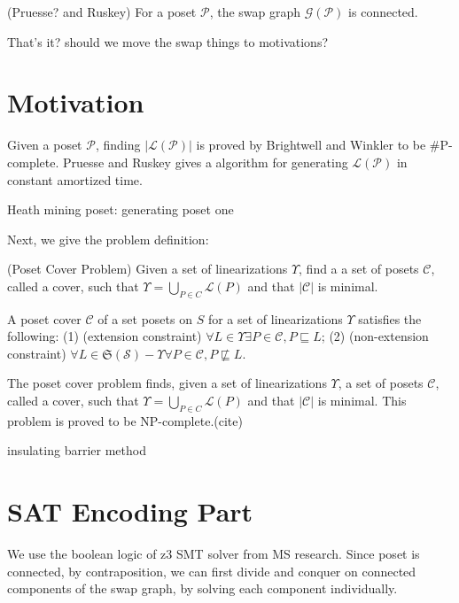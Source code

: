 \documentclass{llncs}
\begin{document}
\begin{theorem}
    (Pruesse? and Ruskey) For a poset $\mathcal{P}$, the swap graph $\mathcal{G}(\mathcal{P})$ is connected.
\end{theorem}

That's it? should we move the swap things to motivations?

\section{Motivation}

Given a poset $\mathcal{P}$, finding $|\mathcal{L}(\mathcal{P})|$ is proved by Brightwell and Winkler to be #P-complete. Pruesse and Ruskey gives a algorithm for generating $\mathcal{L}(\mathcal{P})$ in constant amortized time.

Heath mining poset: generating poset one

Next, we give the problem definition:

\begin{definition}
    (Poset Cover Problem) Given a set of linearizations $\Upsilon$, find a a set of posets $\mathcal{C}$, called a cover, such that $\Upsilon = \bigcup_{P \in C} \mathcal{L}(P)$ and that $|\mathcal{C}|$ is minimal.

    A poset cover $\mathcal{C}$ of a set posets on $S$ for a set of linearizations $\Upsilon$ satisfies the following: (1) (extension constraint) $\forall L \in \Upsilon \exists P \in \mathcal{C}, P \sqsubseteq L$; (2) (non-extension constraint) $\forall L \in \mathfrak{S}(\mathcal{S}) - \Upsilon \forall P \in \mathcal{C}, P \not\sqsubseteq L$.
\end{definition}
The poset cover problem finds, given a set of linearizations $\Upsilon$, a set of posets $\mathcal{C}$, called a cover, such that $\Upsilon = \bigcup_{P \in C} \mathcal{L}(P)$ and that $|\mathcal{C}|$ is minimal. This problem is proved to be NP-complete.(cite)

\begin{theorem}
    insulating barrier method
\end{theorem}

\section{SAT Encoding Part}
We use the boolean logic of z3 SMT solver from MS research. Since poset is connected, by contraposition, we can first divide and conquer on connected components of the swap graph, by solving each component individually.
\end{document}
